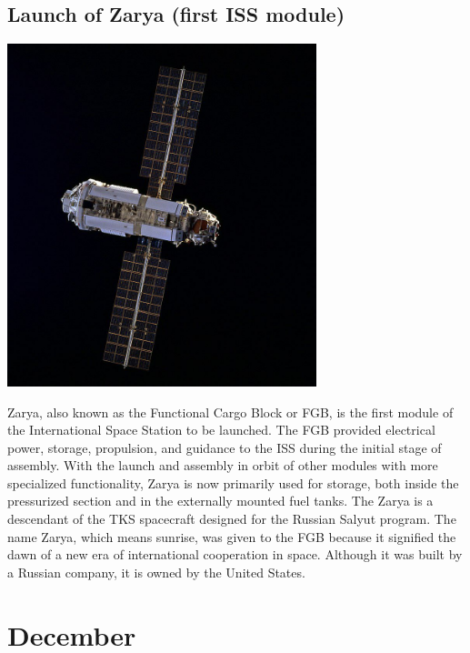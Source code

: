 \documentclass[11pt]{report}
\begin{document}
\subsection{Launch of Zarya (first ISS module)}
\vspace{2mm}\begin{center}\includegraphics[width=9cm]{./img/zarya.jpg}\end{center}
Zarya, also known as the Functional Cargo Block or FGB, is the first module of the International Space Station to be launched. The FGB provided electrical power, storage, propulsion, and guidance to the ISS during the initial stage of assembly. With the launch and assembly in orbit of other modules with more specialized functionality, Zarya is now primarily used for storage, both inside the pressurized section and in the externally mounted fuel tanks. The Zarya is a descendant of the TKS spacecraft designed for the Russian Salyut program. The name Zarya, which means sunrise, was given to the FGB because it signified the dawn of a new era of international cooperation in space. Although it was built by a Russian company, it is owned by the United States.
\section{December}
\end{document}

